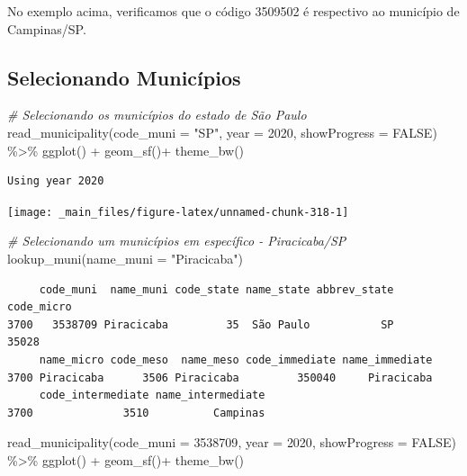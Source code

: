 \documentclass[
  brazilian,
]{book}
\newenvironment{Shaded}{\begin{snugshade}}{\end{snugshade}}
\newcommand{\AttributeTok}[1]{\textcolor[rgb]{0.77,0.63,0.00}{#1}}
\newcommand{\CommentTok}[1]{\textcolor[rgb]{0.56,0.35,0.01}{\textit{#1}}}
\newcommand{\ConstantTok}[1]{\textcolor[rgb]{0.00,0.00,0.00}{#1}}
\newcommand{\DecValTok}[1]{\textcolor[rgb]{0.00,0.00,0.81}{#1}}
\newcommand{\FunctionTok}[1]{\textcolor[rgb]{0.00,0.00,0.00}{#1}}
\newcommand{\NormalTok}[1]{#1}
\newcommand{\SpecialCharTok}[1]{\textcolor[rgb]{0.00,0.00,0.00}{#1}}
\newcommand{\StringTok}[1]{\textcolor[rgb]{0.31,0.60,0.02}{#1}}
\begin{document}
No exemplo acima, verificamos que o código 3509502 é respectivo ao município de Campinas/SP.

\hypertarget{selecionando-municuxedpios}{%
\subsection{Selecionando Municípios}\label{selecionando-municuxedpios}}

\begin{Shaded}
\begin{Highlighting}[]
\CommentTok{\# Selecionando os municípios do estado de São Paulo}
\FunctionTok{read\_municipality}\NormalTok{(}\AttributeTok{code\_muni =} \StringTok{"SP"}\NormalTok{,}
                  \AttributeTok{year =} \DecValTok{2020}\NormalTok{,}
                  \AttributeTok{showProgress =} \ConstantTok{FALSE}\NormalTok{) }\SpecialCharTok{\%\textgreater{}\%} 
  \FunctionTok{ggplot}\NormalTok{() }\SpecialCharTok{+}
  \FunctionTok{geom\_sf}\NormalTok{()}\SpecialCharTok{+}
  \FunctionTok{theme\_bw}\NormalTok{()}
\end{Highlighting}
\end{Shaded}

\begin{verbatim}
Using year 2020
\end{verbatim}

\begin{center}\texttt{[image: \_main\_files/figure-latex/unnamed-chunk-318-1]} \end{center}

\begin{Shaded}
\begin{Highlighting}[]
\CommentTok{\# Selecionando um municípios em específico {-} Piracicaba/SP}
\FunctionTok{lookup\_muni}\NormalTok{(}\AttributeTok{name\_muni =} \StringTok{"Piracicaba"}\NormalTok{)}
\end{Highlighting}
\end{Shaded}

\begin{verbatim}
     code_muni  name_muni code_state name_state abbrev_state code_micro
3700   3538709 Piracicaba         35  São Paulo           SP      35028
     name_micro code_meso  name_meso code_immediate name_immediate
3700 Piracicaba      3506 Piracicaba         350040     Piracicaba
     code_intermediate name_intermediate
3700              3510          Campinas
\end{verbatim}

\begin{Shaded}
\begin{Highlighting}[]
\FunctionTok{read\_municipality}\NormalTok{(}\AttributeTok{code\_muni =} \DecValTok{3538709}\NormalTok{,}
                  \AttributeTok{year =} \DecValTok{2020}\NormalTok{,}
                  \AttributeTok{showProgress =} \ConstantTok{FALSE}\NormalTok{) }\SpecialCharTok{\%\textgreater{}\%}
  \FunctionTok{ggplot}\NormalTok{() }\SpecialCharTok{+}
  \FunctionTok{geom\_sf}\NormalTok{()}\SpecialCharTok{+}
  \FunctionTok{theme\_bw}\NormalTok{()}
\end{Highlighting}
\end{Shaded}
\end{document}
